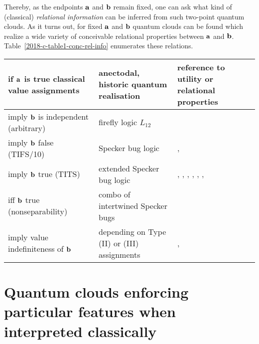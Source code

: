 \documentclass[%
  reprint,
  twocolumn,
 showpacs,
 showkeys,
 preprintnumbers,
 amsmath,amssymb,
 aps,
  prl,
  longbibliography,
 ]{revtex4-1}
\begin{document}
Thereby, as the endpoints ${\bf a}$ and ${\bf b}$ remain fixed, one can ask what kind of (classical) {\em relational information} can
be inferred from such two-point quantum clouds.
As it turns out, for fixed  ${\bf a}$ and ${\bf b}$ quantum clouds can be found which realize a wide variety
of conceivable relational properties between ${\bf a}$ and ${\bf b}$.
Table~\ref{2018-c-table1-conc-rel-info} enumerates these relations.
\begingroup
\squeezetable
\begin{table*}
\begin{ruledtabular}
\begin{tabular}{lll}
if ${\bf a}$ is true classical value assignments  & anectodal, historic quantum realisation & reference to utility or relational properties \\
\hline
imply ${\bf b}$ is independent (arbitrary) & firefly logic $L_{12}$~\cite[pp.~21,~22]{cohen}&  \\
imply ${\bf b}$ false (TIFS/10)  & Specker bug logic~\cite[Fig.~1, p.~182]{kochen2} &   \cite[p.~588-589]{stairs83}, \cite{2018-minimalYIYS}\\
imply ${\bf b}$ true (TITS)  & extended Specker bug logic &  \cite[$\Gamma_1$, p.~68]{kochen1}, \cite[Sects.~II,III, Fig.~1]{clifton-93},
\cite[Fig.~C.l. p.~67]{Belinfante-73}, \cite[p.~394]{Pitowsky-1982-subs}, \cite{Hardy-92,Hardy-93,hardy-97}, \cite{Cabello-1995-ppks,cabello-96,cabello-97-nhvp,Badziag-2011,Cabello-2013-HP,Cabello-2013-Hardylike}, \cite{2018-minimalYIYS}\\
iff ${\bf b}$ true  (nonseparability) & combo of intertwined Specker bugs &  \cite[$\Gamma_3$, p.~70]{kochen1}\\
imply value indefiniteness of ${\bf b}$  & depending on Type (II) or (III) assignments &  \cite{pitowsky:218}, \cite{2015-AnalyticKS}\\
\end{tabular}
\end{ruledtabular}
\caption{Relational properties realizable by two-point quantum clouds.
\label{2018-c-table1-conc-rel-info}}
\end{table*}
\endgroup

\section{Quantum clouds enforcing particular features when interpreted classically}
\end{document}
